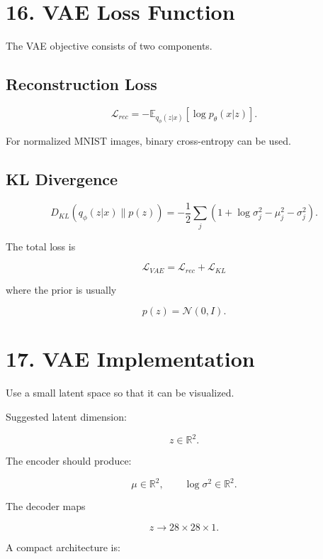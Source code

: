 \documentclass[10pt]{article}
\begin{document}
\section*{16. VAE Loss Function}

The VAE objective consists of two components.

\subsection*{Reconstruction Loss}

\[
\mathcal{L}_{rec}
=
-\mathbb{E}_{q_{\phi}(z|x)}
[\log p_{\theta}(x|z)].
\]

For normalized MNIST images, binary cross-entropy can be used.

\subsection*{KL Divergence}

\[
D_{KL}
\left(
q_{\phi}(z|x)\parallel p(z)
\right)
=
-\frac{1}{2}
\sum_j
\left(
1+\log\sigma_j^2-\mu_j^2-\sigma_j^2
\right).
\]

The total loss is

\[
\boxed{
\mathcal{L}_{VAE}
=
\mathcal{L}_{rec}
+
\mathcal{L}_{KL}
}
\]

where the prior is usually

\[
p(z)=\mathcal{N}(0,I).
\]

\section*{17. VAE Implementation}

Use a small latent space so that it can be visualized.

Suggested latent dimension:

\[
z\in\mathbb{R}^{2}.
\]

The encoder should produce:

\[
\mu\in\mathbb{R}^{2},
\qquad
\log\sigma^2\in\mathbb{R}^{2}.
\]

The decoder maps

\[
z\rightarrow28\times28\times1.
\]

A compact architecture is:

\begin{center}
\end{center}
\end{document}
